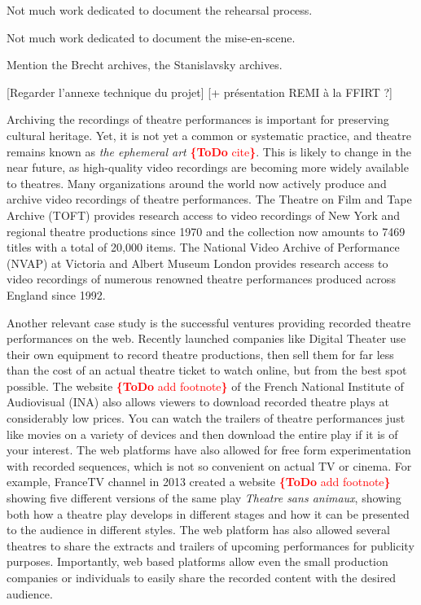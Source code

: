 \documentclass[conference]{IEEEtran}
\newcommand{\todo}[1]{\noindent\textcolor{red}{{\bf \{ToDo} #1{\bf \}}}}
\begin{document}
Not much work dedicated to document the rehearsal process.

Not much work dedicated to document the mise-en-scene.

Mention the Brecht archives, the Stanislavsky archives.

[Regarder l'annexe technique du projet]
[+ présentation REMI à la FFIRT ?]

Archiving the recordings of theatre performances is important for preserving  cultural heritage. 
Yet, it is not yet a common or systematic practice, and theatre remains known as {\em the ephemeral art} \cite{}\todo{cite}.
This is likely to change in the near future, as high-quality video recordings are becoming more widely
available to theatres.   Many organizations around the world now actively produce and
archive video recordings of theatre performances. The Theatre on Film and Tape Archive
(TOFT) provides research access to video recordings of New York and regional theatre productions
since 1970 and the collection now amounts to 7469 titles with a total of 20,000 items. 
The National Video Archive of Performance (NVAP) at Victoria and Albert Museum London
provides research access to video recordings of numerous renowned theatre performances produced
across England since 1992. 

Another relevant case study  is the successful ventures providing recorded
theatre performances on the web. Recently launched companies like Digital Theater use their
own equipment to record theatre productions, then sell them for far less than the cost of an
actual theatre ticket to watch online, but from the best spot possible. The website \todo{add footnote} of the French
National Institute of Audiovisual (INA) also allows viewers to download recorded theatre plays
at considerably low prices. You can watch the trailers of theatre performances just like movies
on a variety of devices and then download the entire play if it is of your interest. The web platforms
have also allowed for free form experimentation with recorded sequences, which is not
so convenient on actual TV or cinema. For example, FranceTV channel in 2013 created a website
\todo{add footnote} showing five different versions of the same play \emph{Theatre sans animaux}, showing both
how a theatre play develops in different stages and how it can be presented to the audience in
different styles. The web platform has also allowed several theatres to share the extracts and
trailers of upcoming performances for publicity purposes. Importantly, web based platforms
allow even the small production companies or individuals to easily share the recorded content
with the desired audience.
\end{document}
